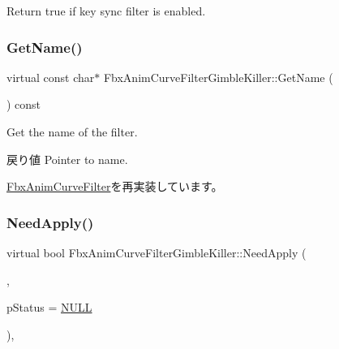 Return {\ttfamily true} if key sync filter is enabled. 

\mbox{\label{class_fbx_anim_curve_filter_gimble_killer_a224d34ab4b2a7f508de5679402c3711f}} 
\subsubsection{\texorpdfstring{Get\+Name()}{GetName()}}
{\footnotesize\ttfamily virtual const char$\ast$ Fbx\+Anim\+Curve\+Filter\+Gimble\+Killer\+::\+Get\+Name (\begin{DoxyParamCaption}{ }\end{DoxyParamCaption}) const\hspace{0.3cm}{\ttfamily [virtual]}}

Get the name of the filter. \begin{DoxyReturn}{戻り値}
Pointer to name. 
\end{DoxyReturn}


\hyperlink{class_fbx_anim_curve_filter_abd559d5052fbb072042e59241940a35c}{Fbx\+Anim\+Curve\+Filter}を再実装しています。

\mbox{\label{class_fbx_anim_curve_filter_gimble_killer_a3b303b3383e638e445e0bd17570be9ea}} 
\subsubsection{\texorpdfstring{Need\+Apply()}{NeedApply()}\hspace{0.1cm}{\footnotesize\ttfamily [1/5]}}
{\footnotesize\ttfamily virtual bool Fbx\+Anim\+Curve\+Filter\+Gimble\+Killer\+::\+Need\+Apply (\begin{DoxyParamCaption}\item[{\hyperlink{class_fbx_anim_stack}{Fbx\+Anim\+Stack} $\ast$}]{,  }\item[{\hyperlink{class_fbx_status}{Fbx\+Status} $\ast$}]{p\+Status = {\ttfamily \hyperlink{fbxarch_8h_a070d2ce7b6bb7e5c05602aa8c308d0c4}{N\+U\+LL}} }\end{DoxyParamCaption})\hspace{0.3cm}{\ttfamily [inline]}, {\ttfamily [virtual]}}

